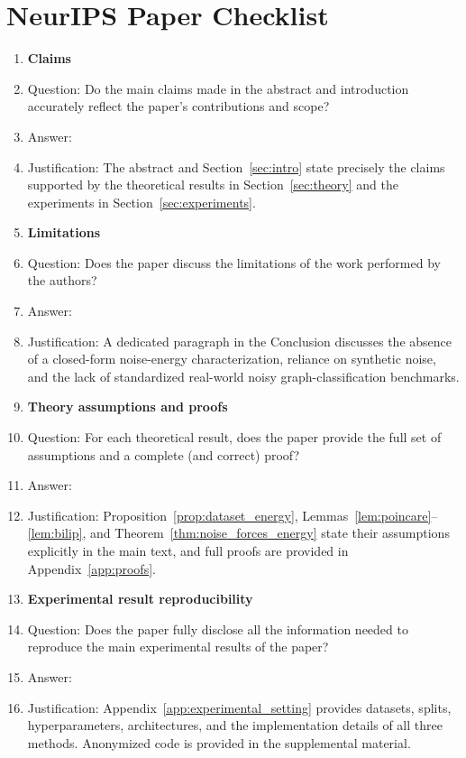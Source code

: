 \section*{NeurIPS Paper Checklist}

\begin{enumerate}

\item {\bf Claims}
    \item[] Question: Do the main claims made in the abstract and introduction accurately reflect the paper's contributions and scope?
    \item[] Answer: \answerYes{}
    \item[] Justification: The abstract and Section~\ref{sec:intro} state precisely the claims supported by the theoretical results in Section~\ref{sec:theory} and the experiments in Section~\ref{sec:experiments}.

\item {\bf Limitations}
    \item[] Question: Does the paper discuss the limitations of the work performed by the authors?
    \item[] Answer: \answerYes{}
    \item[] Justification: A dedicated paragraph in the Conclusion discusses the absence of a closed-form noise-energy characterization, reliance on synthetic noise, and the lack of standardized real-world noisy graph-classification benchmarks.

\item {\bf Theory assumptions and proofs}
    \item[] Question: For each theoretical result, does the paper provide the full set of assumptions and a complete (and correct) proof?
    \item[] Answer: \answerYes{}
    \item[] Justification: Proposition~\ref{prop:dataset_energy}, Lemmas~\ref{lem:poincare}--\ref{lem:bilip}, and Theorem~\ref{thm:noise_forces_energy} state their assumptions explicitly in the main text, and full proofs are provided in Appendix~\ref{app:proofs}.

\item {\bf Experimental result reproducibility}
    \item[] Question: Does the paper fully disclose all the information needed to reproduce the main experimental results of the paper?
    \item[] Answer: \answerYes{}
    \item[] Justification: Appendix~\ref{app:experimental_setting} provides datasets, splits, hyperparameters, architectures, and the implementation details of all three methods. Anonymized code is provided in the supplemental material.


\end{enumerate}
